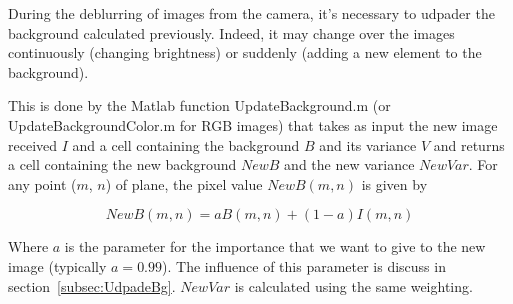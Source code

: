 During the deblurring of images from the camera, it's necessary to udpader the background calculated previously. Indeed, it may change over the images continuously (changing brightness) or  suddenly (adding a new element to the background). 

This is done by the Matlab function UpdateBackground.m (or UpdateBackgroundColor.m for RGB images) that takes as input the new image received $I$ and a cell containing the background $B$ and its variance $V$ and returns a cell containing the new background $NewB$ and the new variance $NewVar$. For any point ($m$, $n$) of plane, the pixel value $NewB(m,n)$ is given by

$$NewB(m,n) = a B(m,n) + (1-a) I(m,n)$$

Where $a$ is the parameter for the importance that we want to give to the new image (typically $a = 0.99$). The influence of this parameter is discuss in section~\ref{subsec:UdpadeBg}.
$NewVar$ is calculated using the same weighting.